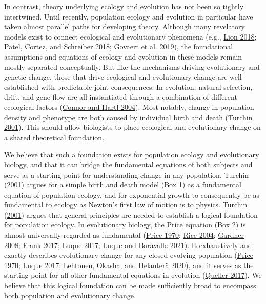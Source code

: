 \documentclass[
]{article}
\begin{document}
In contrast, theory underlying ecology and evolution has not been so
tightly intertwined. Until recently, population ecology and evolution in
particular have taken almost parallel paths for developing theory.
Although many revelatory models exist to connect ecological and
evolutionary phenomena (e.g., \protect\hyperlink{ref-Lion2018}{Lion
2018}; \protect\hyperlink{ref-Patel2018}{Patel, Cortez, and Schreiber
2018}; \protect\hyperlink{ref-Govaert2019}{Govaert et al. 2019}), the
foundational assumptions and equations of ecology and evolution in these
models remain mostly separated conceptually. But like the mechanisms
driving evolutionary and genetic change, those that drive ecological and
evolutionary change are well-established with predictable joint
consequences. In evolution, natural selection, drift, and gene flow are
all instantiated through a combination of different ecological factors
(\protect\hyperlink{ref-Connor2004}{Connor and Hartl 2004}). Most
notably, change in population density and phenotype are both caused by
individual birth and death (\protect\hyperlink{ref-Turchin2001}{Turchin
2001}). This should allow biologists to place ecological and
evolutionary change on a shared theoretical foundation.

We believe that such a foundation exists for population ecology and
evolutionary biology, and that it can bridge the fundamental equations
of both subjects and serve as a starting point for understanding change
in any population. Turchin (\protect\hyperlink{ref-Turchin2001}{2001})
argues for a simple birth and death model (Box 1) as a fundamental
equation of population ecology, and for exponential growth to
consequently be as fundamental to ecology as Newton's first law of
motion is to physics. Turchin
(\protect\hyperlink{ref-Turchin2001}{2001}) argues that general
principles are needed to establish a logical foundation for population
ecology. In evolutionary biology, the Price equation (Box 2) is almost
universally regarded as fundamental
(\protect\hyperlink{ref-Price1970}{Price 1970};
\protect\hyperlink{ref-Rice2004}{Rice 2004};
\protect\hyperlink{ref-Gardner2008}{Gardner 2008};
\protect\hyperlink{ref-Frank2015a}{Frank 2017};
\protect\hyperlink{ref-Luque2016}{Luque 2017};
\protect\hyperlink{ref-Luque2021}{Luque and Baravalle 2021}). It
exhaustively and exactly describes evolutionary change for any closed
evolving population (\protect\hyperlink{ref-Price1970}{Price 1970};
\protect\hyperlink{ref-Luque2016}{Luque 2017};
\protect\hyperlink{ref-Lehtonen2020}{Lehtonen, Okasha, and Helanterä
2020}), and it serves as the starting point for all other fundamental
equations in evolution (\protect\hyperlink{ref-Queller2017}{Queller
2017}). We believe that this logical foundation can be made sufficiently
broad to encompass both population and evolutionary change.
\end{document}
